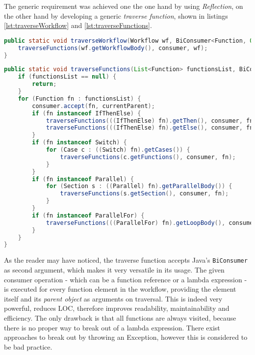 \begin{appendix}
The generic requirement was achieved one the one hand by using \textit{Reflection}, on the other hand by developing a generic \textit{traverse function}, shown in listings \ref{lst:traverseWorkflow} and \ref{lst:traverseFunctions}.

\begin{lstlisting}[language=Java,caption={Traverse workflow},label={lst:traverseWorkflow}]
public static void traverseWorkflow(Workflow wf, BiConsumer<Function, Object> consumer) {
    traverseFunctions(wf.getWorkflowBody(), consumer, wf);
}
\end{lstlisting}

\begin{lstlisting}[language=Java,caption={Traverse functions},label={lst:traverseFunctions}]
public static void traverseFunctions(List<Function> functionsList, BiConsumer<Function, Object> consumer, Object currentParent) {
    if (functionsList == null) {
        return;
    }
    for (Function fn : functionsList) {
        consumer.accept(fn, currentParent);
        if (fn instanceof IfThenElse) {
            traverseFunctions(((IfThenElse) fn).getThen(), consumer, fn);
            traverseFunctions(((IfThenElse) fn).getElse(), consumer, fn);
        }
        if (fn instanceof Switch) {
            for (Case c : ((Switch) fn).getCases()) {
                traverseFunctions(c.getFunctions(), consumer, fn);
            }
        }
        if (fn instanceof Parallel) {
            for (Section s : ((Parallel) fn).getParallelBody()) {
                traverseFunctions(s.getSection(), consumer, fn);
            }
        }
        if (fn instanceof ParallelFor) {
            traverseFunctions(((ParallelFor) fn).getLoopBody(), consumer, fn);
        }
    }
}
\end{lstlisting}

As the reader may have noticed, the traverse function accepts Java's \texttt{BiConsumer} as second argument, which makes it very versatile in its usage. The given consumer operation - which can be a function reference or a lambda expression - is executed for every function element in the workflow, providing the element itself and its \textit{parent object} as arguments on traversal. This is indeed very powerful, reduces LOC, therefore improves readability, maintainability and efficiency. The only drawback is that all functions are always visited, because there is no proper way to break out of a lambda expression. There exist approaches to break out by throwing an Exception, however this is considered to be bad practice.


\end{appendix}
